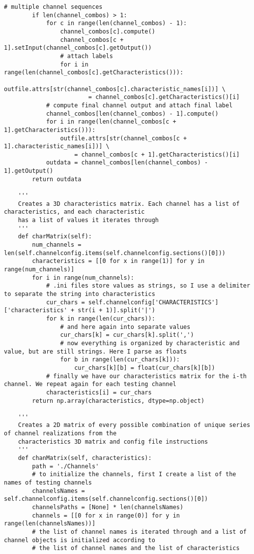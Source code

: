 \begin{lstlisting}[breaklines]
        # multiple channel sequences
        if len(channel_combos) > 1:
            for c in range(len(channel_combos) - 1):
                channel_combos[c].compute()
                channel_combos[c + 1].setInput(channel_combos[c].getOutput())
                # attach labels
                for i in range(len(channel_combos[c].getCharacteristics())):
                    outfile.attrs[str(channel_combos[c].characteristic_names[i])] \
                        = channel_combos[c].getCharacteristics()[i]
            # compute final channel output and attach final label
            channel_combos[len(channel_combos) - 1].compute()
            for i in range(len(channel_combos[c + 1].getCharacteristics())):
                outfile.attrs[str(channel_combos[c + 1].characteristic_names[i])] \
                    = channel_combos[c + 1].getCharacteristics()[i]
            outdata = channel_combos[len(channel_combos) - 1].getOutput()
        return outdata

    '''
    Creates a 3D characteristics matrix. Each channel has a list of characteristics, and each characteristic
    has a list of values it iterates through
    '''
    def charMatrix(self):
        num_channels = len(self.channelconfig.items(self.channelconfig.sections()[0]))
        characteristics = [[0 for x in range(1)] for y in range(num_channels)]
        for i in range(num_channels):
            # .ini files store values as strings, so I use a delimiter to separate the string into characteristics
            cur_chars = self.channelconfig['CHARACTERISTICS']['characteristics' + str(i + 1)].split('|')
            for k in range(len(cur_chars)):
                # and here again into separate values
                cur_chars[k] = cur_chars[k].split(',')
                # now everything is organized by characteristic and value, but are still strings. Here I parse as floats
                for b in range(len(cur_chars[k])):
                    cur_chars[k][b] = float(cur_chars[k][b])
            # finally we have our characteristics matrix for the i-th channel. We repeat again for each testing channel
            characteristics[i] = cur_chars
        return np.array(characteristics, dtype=np.object)

    '''
    Creates a 2D matrix of every possible combination of unique series of channel realizations from the
    characteristics 3D matrix and config file instructions
    '''
    def chanMatrix(self, characteristics):
        path = './Channels'
        # to initialize the channels, first I create a list of the names of testing channels
        channelsNames = self.channelconfig.items(self.channelconfig.sections()[0])
        channelsPaths = [None] * len(channelsNames)
        channels = [[0 for x in range(0)] for y in range(len(channelsNames))]
        # the list of channel names is iterated through and a list of channel objects is initialized according to
        # the list of channel names and the list of characteristics


\end{lstlisting}
